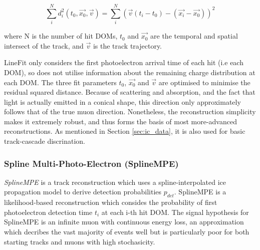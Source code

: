 \begin{equation}
	\sum^{N}_{i} d_{i}^{2}(t_{0}, \vec{x_{0}}, \vec{v})= \sum^{N}_{i}  \left( \vec{v}(t_{i} - t_{0}) - (\vec{x_{i}} - \vec{x_{0}}) \right)^{2}
\end{equation} 

where N is the number of hit DOMs, $t_{0}$ and $\vec{x_{0}}$ are the temporal and spatial intersect of the track, and $\vec{v}$ is the track trajectory. 

LineFit only considers the first photoelectron arrival time of each hit (i.e each DOM), so does not utilise information about the remaining charge distribution at each DOM. The three fit parameters $t_{0}$, $\vec{x_{0}}$ and $\vec{v}$ are optimised to minimise the residual squared distance. Because of scattering and absorption, and the fact that light is actually emitted in a conical shape, this direction only approximately follows that of the true muon direction. Nonetheless, the reconstruction simplicity makes it extremely robust, and thus forms the basis of most more-advanced reconstructions. As mentioned in Section \ref{sec:ic_data}, it is also used for basic track-cascade discrination.

%
%
%

\subsubsection{Spline Multi-Photo-Electron (SplineMPE)}
 \emph{SplineMPE} is a track reconstruction which uses a spline-interpolated ice propagation model to derive detection probabilities $p_{det}$. SplineMPE is a likelihood-based reconstruction which consides the probability of first photoelectron detection time $t_{i}$ at each i-th hit DOM. The signal hypothesis for SplineMPE is an infinite muon with continuous energy loss, an approximation which decribes the vast majority of events well but is particularly poor for both starting tracks and muons with high stochasicity.

